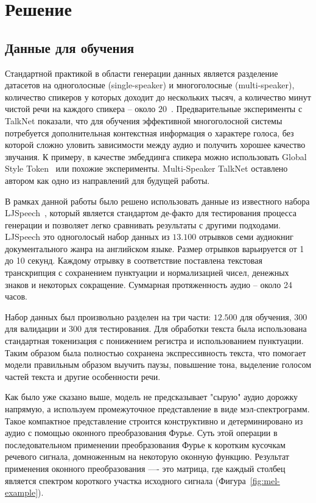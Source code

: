 \section{Решение}

\subsection{Данные для обучения}

Стандартной практикой в области генерации данных является разделение датасетов на одноголосные (single-speaker) и многоголосные (multi-speaker), количество спикеров у которых доходит до нескольких тысяч, а количество минут чистой речи на каждого спикера -- около $20$~\cite{libritts}. Предварительные эксперименты с TalkNet показали, что для обучения эффективной многоголосной системы потребуется дополнительная контекстная информация о характере голоса, без которой сложно уловить зависимости между аудио и получить хорошее качество звучания. К примеру, в качестве эмбеддинга спикера можно использовать Global Style Token~\cite{wang2018style} или похожие эксперименты. Multi-Speaker TalkNet оставлено автором как одно из направлений для будущей работы.

В рамках данной работы было решено использовать данные из известного набора LJSpeech~\cite{ljspeech}, который является стандартом де-факто для тестирования процесса генерации и позволяет легко сравнивать результаты с другими подходами. LJSpeech это одноголосый набор данных из $13.100$ отрывков семи аудиокниг документального жанра на английском языке. Размер отрывков варьируется от 1 до 10 секунд. Каждому отрывку в соответствие поставлена текстовая транскрипция с сохранением пунктуации и нормализацией чисел, денежных знаков и некоторых сокращение. Суммарная протяженность аудио -- около 24 часов.

Набор данных был произвольно разделен на три части: $12.500$ для обучения, 300 для валидации и 300 для тестирования. Для обработки текста была использована стандартная токенизация с понижением регистра и использованием пунктуации. Таким образом была полностью сохранена экспрессивность текста, что помогает модели правильным образом выучить паузы, повышение тона, выделение голосом частей текста и другие особенности речи.

Как было уже сказано выше, модель не предсказывает "сырую" аудио дорожку напрямую, а используем промежуточное представление в виде мэл-спектрограмм. Такое компактное представление строится конструктивно и детерминировано из аудио с помощью оконного преобразования Фурье. Суть этой операции в последовательном применении преобразования Фурье к коротким кусочкам речевого сигнала, домноженным на некоторую оконную функцию. Результат применения оконного преобразования —- это матрица, где каждый столбец является спектром короткого участка исходного сигнала (Фигура~\ref{fig:mel-example}).

